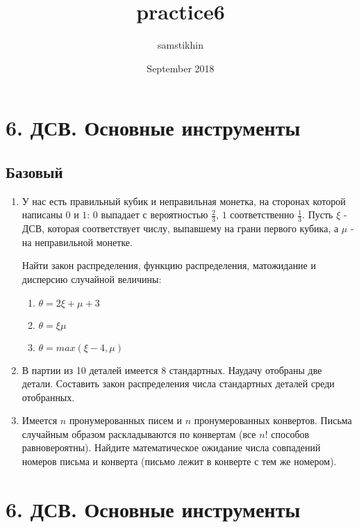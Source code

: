 \documentclass[a4paper, 14pt]{extarticle}
\title{practice6}
\author{samstikhin}
\date{September 2018}
\begin{document}
\section*{6. ДСВ. Основные инструменты}
\subsection*{Базовый}
\begin{enumerate}
\item У нас есть правильный кубик и неправильная монетка, на сторонах которой написаны $0$ и $1$: $0$ выпадает с вероятностью $\frac{2}{3}$, $1$ соответственно $\frac{1}{3}$. Пусть $\xi$ - ДСВ, которая соответствует числу, выпавшему на грани первого кубика, а $\mu$ - на неправильной монетке.

Найти закон распределения, функцию распределения, матожидание и дисперсию случайной величины:
\begin{enumerate}
    \item $\theta = 2\xi +\mu +  3$
    \item $\theta = \xi\mu$
    \item $\theta = max(\xi-4, \mu)$
\end{enumerate}

\item В партии из 10 деталей имеется 8 стандартных.
	Наудачу отобраны две детали. Составить закон 
	распределения числа стандартных деталей среди отобранных.

	
\item Имеется $n$ пронумерованных писем и $n$ пронумерованных конвертов. Письма случайным образом раскладываются по конвертам (все $n!$
	способов равновероятны). Найдите математическое ожидание числа
	совпадений номеров письма и конверта (письмо лежит в конверте с
	тем же номером).
\end{enumerate}

\newpage

\section*{6. ДСВ. Основные инструменты}
\end{document}
